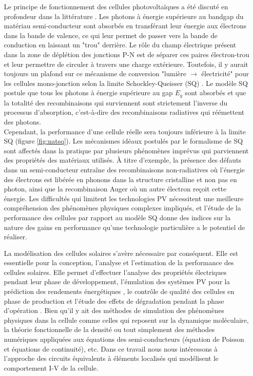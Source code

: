 Le principe de fonctionnement des cellules photovoltaïques a été discuté en profondeur dans la littérature \cite{Fraas2010,  Sze2006, Wenham2013}.
Les photons à énergie supérieure au bandgap du matériau semi-conducteur sont absorbés en transférant leur énergie aux électrons dans la bande de valence, ce qui leur permet de passer vers la bande de conduction en laissant un "trou" derrière. Le rôle du champ électrique présent dans la zone de déplétion des jonctions P-N est de séparer ces paires électron-trou et leur permettre de circuler à travers une charge extérieure. Toutefois, il y aurait toujours un plafond sur ce mécanisme de conversion "lumière $\rightarrow$ électricité" pour les cellules mono-jonction selon la limite Schockley-Queisser (SQ)  \cite{Shockley1961}. Le modèle SQ postule que tous les photons à énergie supérieure au gap $E_g$ sont absorbés et que la totalité des recombinaisons qui surviennent sont strictement l'inverse du processus d'absorption, c'est-à-dire des recombinaisons radiatives qui réémettent des photons.\\
Cependant, la performance d'une cellule réelle sera toujours inférieure à la limite SQ (figure \ref{fig:natsq}). Les mécanismes idéaux postulés par le formalisme de SQ sont affectés dans la pratique par plusieurs phénomènes imprévus qui parviennent des propriétés des matériaux utilisés. À titre d'exemple, la présence des défauts dans un semi-conducteur entraîne des recombinaisons non-radiatives où l'énergie des électrons est libérée en phonons dans la structure cristalline et non pas en photon, ainsi que la recombinaison Auger où un autre électron reçoit cette énergie. Les difficultés qui limitent les technologies PV nécessitent une meilleure compréhension des phénomènes physiques complexes impliqués, et l'étude de la performance des cellules par rapport au modèle SQ donne des indices sur la nature des gains en performance qu'une technologie particulière a le potentiel de réaliser.

La modélisation des cellules solaires s'avère nécessaire par conséquent. Elle est essentielle pour la conception, l'analyse et l'estimation de la performance des cellules solaires. Elle permet d'effectuer l'analyse des propriétés électriques pendant leur phase de développement, l'émulation des systèmes PV pour la prédiction des rendements énergétiques \cite{Ram2018}, le contrôle de qualité des cellules en phase de production %
et l'étude des effets de dégradation pendant la phase d'opération \cite{Kennerud1969, Jamil2017}. Bien qu'il y ait des méthodes de simulation des phénomènes physiques dans la cellule comme celles qui reposent sur la dynamique moléculaire, la théorie fonctionnelle de la densité ou tout simplement des méthodes numériques appliquées aux équations des semi-conducteurs (équation de Poisson et équations de continuité), etc. Dans ce travail nous nous intéressons à l'approche des circuits équivalents à éléments localisés qui modélisent le comportement I-V de la cellule.

